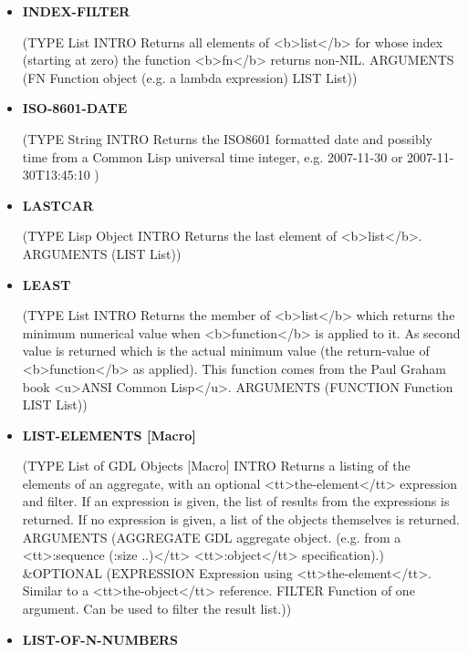 \documentclass [11pt]{book}
\begin{document}
\begin{itemize}
\item {}
\label{prim:index-filter}
\textbf{INDEX-FILTER}

(TYPE List INTRO  Returns all elements of <b>list</b> for whose index (starting at zero) the
function <b>fn</b> returns non-NIL.
 ARGUMENTS (FN Function object (e.g. a lambda expression) LIST List))



\item {}
\label{prim:iso-8601-date}
\textbf{ISO-8601-DATE}

(TYPE String INTRO  Returns the ISO8601 formatted date and possibly time from a
Common Lisp universal time integer, e.g. 2007-11-30 or
2007-11-30T13:45:10
)



\item {}
\label{prim:lastcar}
\textbf{LASTCAR}

(TYPE Lisp Object INTRO  Returns the last element of <b>list</b>.
 ARGUMENTS (LIST List))



\item {}
\label{prim:least}
\textbf{LEAST}

(TYPE List INTRO  Returns the member of <b>list</b> which returns the minimum numerical value
when <b>function</b> is applied to it. As second value is returned which is the
actual minimum value (the return-value of <b>function</b> as applied). This function
comes from the Paul Graham book <u>ANSI Common Lisp</u>.
 ARGUMENTS (FUNCTION Function LIST List))



\item {}
\label{prim:list-elements}
\textbf{LIST-ELEMENTS [Macro]}

(TYPE List of GDL Objects [Macro] INTRO  Returns a listing of the elements of an aggregate,
with an optional <tt>the-element</tt> expression and filter. If an expression is given,
the list of results from the expressions is returned. If no expression is given, a list
of the objects themselves is returned.
 ARGUMENTS (AGGREGATE GDL aggregate object. (e.g. from a <tt>:sequence (:size ..)</tt> <tt>:object</tt> specification).) \&OPTIONAL (EXPRESSION Expression using <tt>the-element</tt>. Similar to a <tt>the-object</tt> reference. FILTER Function of one argument. Can be used to filter the result list.))



\item {}
\label{prim:list-of-n-numbers}
\textbf{LIST-OF-N-NUMBERS}


\end{itemize}
\end{document}
